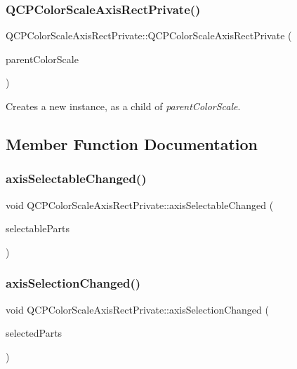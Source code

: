 \subsubsection{\texorpdfstring{QCPColorScaleAxisRectPrivate()}{QCPColorScaleAxisRectPrivate()}}
{\footnotesize\ttfamily Q\+C\+P\+Color\+Scale\+Axis\+Rect\+Private\+::\+Q\+C\+P\+Color\+Scale\+Axis\+Rect\+Private (\begin{DoxyParamCaption}\item[{\mbox{\hyperlink{class_q_c_p_color_scale}{Q\+C\+P\+Color\+Scale}} $\ast$}]{parent\+Color\+Scale }\end{DoxyParamCaption})\hspace{0.3cm}{\ttfamily [explicit]}}

Creates a new instance, as a child of {\itshape parent\+Color\+Scale}. 

\subsection{Member Function Documentation}
\mbox{\label{class_q_c_p_color_scale_axis_rect_private_a66d2baed86966bb03a6d7c32dc7d59f7}} 
\subsubsection{\texorpdfstring{axisSelectableChanged()}{axisSelectableChanged()}}
{\footnotesize\ttfamily void Q\+C\+P\+Color\+Scale\+Axis\+Rect\+Private\+::axis\+Selectable\+Changed (\begin{DoxyParamCaption}\item[{Q\+C\+P\+Axis\+::\+Selectable\+Parts}]{selectable\+Parts }\end{DoxyParamCaption})\hspace{0.3cm}{\ttfamily [protected]}}

\mbox{\label{class_q_c_p_color_scale_axis_rect_private_a6112ad4291ac1695d37659cb049d598d}} 
\subsubsection{\texorpdfstring{axisSelectionChanged()}{axisSelectionChanged()}}
{\footnotesize\ttfamily void Q\+C\+P\+Color\+Scale\+Axis\+Rect\+Private\+::axis\+Selection\+Changed (\begin{DoxyParamCaption}\item[{Q\+C\+P\+Axis\+::\+Selectable\+Parts}]{selected\+Parts }\end{DoxyParamCaption})\hspace{0.3cm}{\ttfamily [protected]}}

